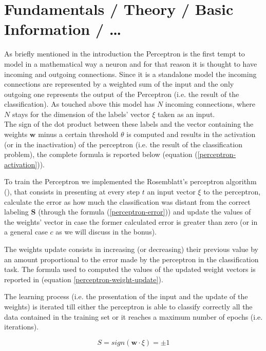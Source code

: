 \section{Fundamentals / Theory / Basic Information / \ldots}
\label{sec:fundamentals}
As briefly mentioned in the introduction the Perceptron is the first tempt to model in a mathematical way
a neuron and for that reason it is thought to have incoming and outgoing connections. Since it is a standalone
model the incoming connections are represented by a weighted sum of the input and the only outgoing one represents
the output of the Perceptron (i.e. the result of the classification). As touched above this model has $N$ incoming connections,
where $N$ stays for the dimension of the labels' vector $\xi$ taken as an input.\\
The sign of the dot product between these labels and the vector containing the weights $\mathsf{\bm{w}}$ minus a certain threshold
$\theta$ is computed and results in the activation (or in the inactivation) of the perceptron (i.e. the result of the classification problem),
the complete formula is reported below (equation (\ref{perceptron-activation})).

To train the Perceptron we implemented the Rosemblatt's perceptron algorithm (\cite{rosenblatt1958perceptron}), that consists in
presenting at every step $t$ an input vector $\xi$ to the perceptron, calculate the error as how much the classification was distant from
the correct labeling $\bm{S}$ (through the formula (\ref{perceptron-error})) and update the values of the weights' vector in case the former
calculated error is greater than zero (or in a general case $c$ as we will discuss in the bonus).

The weights update consists in increasing (or decreasing) their previous value by an amount proportional to the error made
by the perceptron in the classification task. The formula used to computed the values of the updated weight vectors is reported in (equation
\ref{perceptron-weight-update}).

The learning process (i.e. the presentation of the input and the update of the weights) is iterated till either the perceptron is able to classify correctly
all the data contained in the training set or it reaches a maximum number of epochs (i.e. iterations).

\begin{equation} \label{perceptron-activation}
    S = sign(\mathsf{\bm{w}} \cdotp \xi) = \pm 1
\end{equation}

